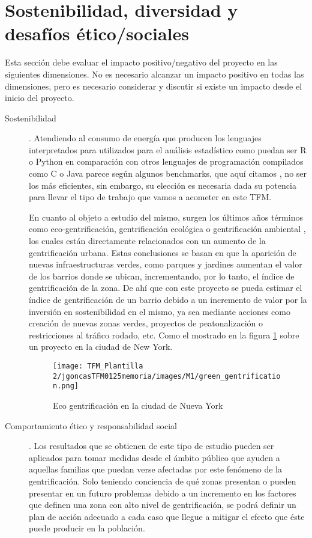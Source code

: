 \documentclass[12pt,a4paper,twoside]{book}
\begin{document}
\section{Sostenibilidad, diversidad y desafíos ético/sociales}

Esta sección debe evaluar el impacto positivo/negativo del proyecto en las siguientes dimensiones. No es necesario alcanzar un impacto positivo en todas las dimensiones, pero es necesario considerar y discutir si existe un impacto desde el inicio del proyecto.

\begin{description}
    \item[Sostenibilidad]. Atendiendo al consumo de energía que producen los lenguajes interpretados para utilizados para el análisis estadístico como puedan ser R o Python en comparación con otros lenguajes de programación compilados como C o Java parece según algunos benchmarks, que aquí citamos \cite{georgiou_analyzing_2017} \cite{inproceedings}, no ser los más eficientes, sin embargo, su elección es necesaria dada su potencia para llevar el tipo de trabajo que vamos a acometer en este TFM.

    En cuanto al objeto a estudio del mismo, surgen los últimos años términos como eco-gentrificación, gentrificación ecológica o gentrificación ambiental \cite{perrozzi_gentrificacion_2023}, los cuales están directamente relacionados con un aumento de la gentrificación urbana. Estas conclusiones se basan en que la aparición de nuevas infraestructuras verdes, como parques y jardines aumentan el valor de los barrios donde se ubican, incrementando, por lo tanto, el índice de gentrificación de la zona. De ahí que con este proyecto se pueda estimar el índice de gentrificación de un barrio debido a un incremento de valor por la inversión en sostenibilidad en el mismo, ya sea mediante acciones como creación de nuevas zonas verdes, proyectos de peatonalización o restricciones al tráfico rodado, etc. Como el mostrado en la figura \ref{fig:eco_gentrificacion} sobre un proyecto en la ciudad de New York.
    \begin{figure}[h!]
        \centering
        \texttt{[image: TFM\_Plantilla 2/jgoncasTFM0125memoria/images/M1/green\_gentrification.png]}
        \caption{Eco gentrificación en la ciudad de Nueva York}
        \label{fig:eco_gentrificacion}
    \end{figure}

    \item[Comportamiento ético y responsabilidad social]. Los resultados que se obtienen de este tipo de estudio pueden ser aplicados para tomar medidas desde el ámbito público que ayuden a aquellas familias que puedan verse afectadas por este fenómeno de la gentrificación. 
    Solo teniendo conciencia de qué zonas presentan o pueden presentar en un futuro problemas debido a un incremento en los factores que definen una zona con alto nivel de gentrificación, se podrá definir un plan de acción adecuado a cada caso que llegue a mitigar el efecto que éste puede producir en la población.
    

\end{description}
\end{document}

